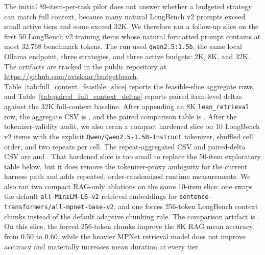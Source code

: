 \documentclass[11pt]{article}
\newcommand{\RunModel}{\texttt{qwen2.5:1.5b}}
\newcommand{\RepoURL}{\url{https://github.com/aviskaar/budgetbench}}
\begin{document}
The initial 89-item-per-task pilot does not answer whether a budgeted strategy can
match full context, because many natural LongBench v2 prompts exceed small
active tiers and some exceed 32K.  We therefore ran a follow-up slice on the
first 50 LongBench v2 training items whose natural formatted prompt contains
at most 32,768 benchmark tokens.  The run used \RunModel{}, the same local
Ollama endpoint, three strategies, and three active budgets: 2K, 8K, and 32K.
The artifacts are tracked in the public repository at \RepoURL{}.
Table~\ref{tab:full_context_feasible_slice} reports the feasible-slice
aggregate rows, and Table~\ref{tab:paired_full_context_deltas} reports paired
item-level deltas against the 32K full-context baseline.  After
appending an 8K \texttt{lean\_retrieval} row, the aggregate CSV is
, and the paired
comparison table is
.
After the tokenizer-validity audit, we also reran a compact hardened slice on
10 LongBench v2 items with the explicit
\texttt{Qwen/Qwen2.5-1.5B-Instruct} tokenizer, shuffled cell order, and two
repeats per cell.  The repeat-aggregated CSV and paired-delta CSV are
 and
.  That hardened
slice is too small to replace the 50-item exploratory table below, but it does
remove the tokenizer-proxy ambiguity for the current harness path and adds
repeated, order-randomized runtime measurements.
We also ran two compact RAG-only ablations on the same 10-item slice: one swaps
the default \texttt{all-MiniLM-L6-v2} retrieval embeddings for
\texttt{sentence-transformers/all-mpnet-base-v2}, and one forces 256-token
LongBench context chunks instead of the default adaptive chunking rule.  The
comparison artifact is .  On
this slice, the forced 256-token chunks improve the 8K RAG mean accuracy from
0.50 to 0.60, while the heavier MPNet retrieval model does not improve
accuracy and materially increases mean duration at every tier.
\end{document}
